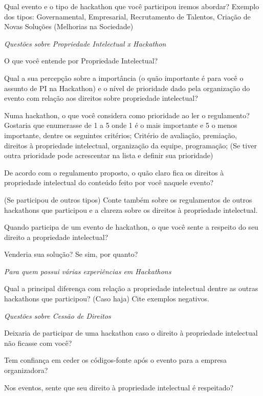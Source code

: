 Qual evento e o tipo de hackathon que você participou iremos abordar?
Exemplo dos tipos: Governamental, Empresarial, Recrutamento de Talentos, Criação de Novas Soluções (Melhorias na Sociedade)

\vspace{4mm} 
\textit{Questões sobre Propriedade Intelectual x Hackathon}

O que você entende por Propriedade Intelectual?

Qual a sua percepção sobre a importância (o quão importante é para você o assunto de PI na Hackathon) e o nível de prioridade dado pela organização do evento com relação aos direitos sobre propriedade intelectual?

Numa hackathon, o que você considera como prioridade ao ler o regulamento? Gostaria que enumerasse de 1 a 5 onde 1 é o mais importante e 5 o menos importante, dentre os seguintes critérios; Critério de avaliação, premiação, direitos à propriedade intelectual, organização da equipe, programação; (Se tiver outra prioridade pode acrescentar na lista e definir sua prioridade)

De acordo com o regulamento proposto, o quão claro fica  os direitos à propriedade intelectual do conteúdo feito por você naquele evento?

(Se participou de outros tipos) Conte também sobre os regulamentos de outros hackathons que participou e a clareza sobre os direitos à propriedade intelectual.

Quando participa de um evento de hackathon, o que você sente a respeito do seu direito a propriedade intelectual?

Venderia sua solução? Se sim, por quanto?

\vspace{4mm}
\textit{Para quem possui várias experiências em Hackathons}

Qual a principal diferença com relação a propriedade intelectual dentre as outras hackathons que participou? (Caso haja) Cite exemplos negativos.

\vspace{4mm}
\textit{Questões sobre Cessão de Direitos}

Deixaria de participar de uma hackathon caso o direito à propriedade intelectual não ficasse com você?

Tem confiança em ceder os códigos-fonte após o evento para a empresa organizadora?

Nos eventos, sente que seu direito à propriedade intelectual é respeitado?


